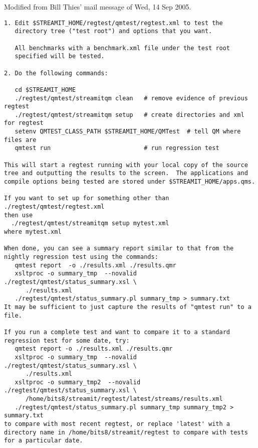 \documentclass[11pt]{article}
\begin{document}
Modified from Bill Thies' mail message of  Wed, 14 Sep 2005.
\begin{verbatim}
1. Edit $STREAMIT_HOME/regtest/qmtest/regtest.xml to test the
   directory tree ("test root") and options that you want.

   All benchmarks with a benchmark.xml file under the test root
   specified will be tested.

2. Do the following commands:

   cd $STREAMIT_HOME
   ./regtest/qmtest/streamitqm clean   # remove evidence of previous regtest
   ./regtest/qmtest/streamitqm setup   # create directories and xml for regtest
   setenv QMTEST_CLASS_PATH $STREAMIT_HOME/QMTest  # tell QM where files are
   qmtest run                          # run regression test

This will start a regtest running with your local copy of the source
tree and outputting the results to the screen.  The applications and
compile options being tested are stored under $STREAMIT_HOME/apps.qms.

If you want to set up for something other than ./regtest/qmtest/regtest.xml
then use 
  ./regtest/qmtest/streamitqm setup mytest.xml
where mytest.xml 

When done, you can see a summary report similar to that from the
nightly regression test using the commands:
   qmtest report  -o ./results.xml ./results.qmr 
   xsltproc -o summary_tmp  --novalid ./regtest/qmtest/status_summary.xsl \
      ./results.xml
   ./regtest/qmtest/status_summary.pl summary_tmp > summary.txt
It may be sufficient to just capture the results of "qmtest run" to a file.

If you run a complete test and want to compare it to a standard
regression test for some date, try:
   qmtest report -o ./results.xml ./results.qmr 
   xsltproc -o summary_tmp  --novalid ./regtest/qmtest/status_summary.xsl \
      ./results.xml
   xsltproc -o summary_tmp2  --novalid ./regtest/qmtest/status_summary.xsl \
      /home/bits8/streamit/regtest/latest/streams/results.xml
   ./regtest/qmtest/status_summary.pl summary_tmp summary_tmp2 > summary.txt
to compare with most recent regtest, or replace 'latest' with a
directory name in /home/bits8/streamit/regtest to compare with tests
for a particular date.
\end{verbatim}
\end{document}
